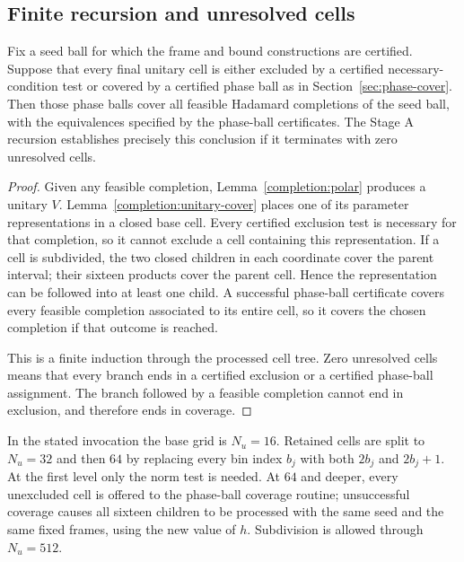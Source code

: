 \subsection{Finite recursion and unresolved cells}

\begin{proposition}
\label{completion:recursion}
Fix a seed ball for which the frame and bound constructions are certified.
Suppose that every final unitary cell is either excluded by a certified
necessary-condition test or covered by a certified phase ball as in
Section~\ref{sec:phase-cover}.  Then those phase balls cover all feasible
Hadamard completions of the seed ball, with the equivalences specified by
the phase-ball certificates.  The Stage A recursion establishes precisely
this conclusion if it terminates with zero unresolved cells.
\end{proposition}

\begin{proof}
Given any feasible completion, Lemma~\ref{completion:polar} produces a
unitary $V$.  Lemma~\ref{completion:unitary-cover} places one of its
parameter representations in a closed base cell.  Every certified
exclusion test is necessary for that completion, so it cannot exclude a
cell containing this representation.  If a cell is subdivided, the two
closed children in each coordinate cover the parent interval; their
sixteen products cover the parent cell.  Hence the representation can be
followed into at least one child.  A successful phase-ball certificate
covers every feasible completion associated to its entire cell, so it
covers the chosen completion if that outcome is reached.

This is a finite induction through the processed cell tree.  Zero
unresolved cells means that every branch ends in a certified exclusion or
a certified phase-ball assignment.  The branch followed by a feasible
completion cannot end in exclusion, and therefore ends in coverage.
\end{proof}

In the stated invocation the base grid is $N_u=16$.  Retained cells are
split to $N_u=32$ and then $64$ by replacing every bin index $b_j$ with
both $2b_j$ and $2b_j+1$.  At the first level only the norm test is needed.
At $64$ and deeper, every unexcluded cell is offered to the phase-ball
coverage routine; unsuccessful coverage causes all sixteen children to be
processed with the same seed and the same fixed frames, using the new
value of $h$.  Subdivision is allowed through $N_u=512$.

